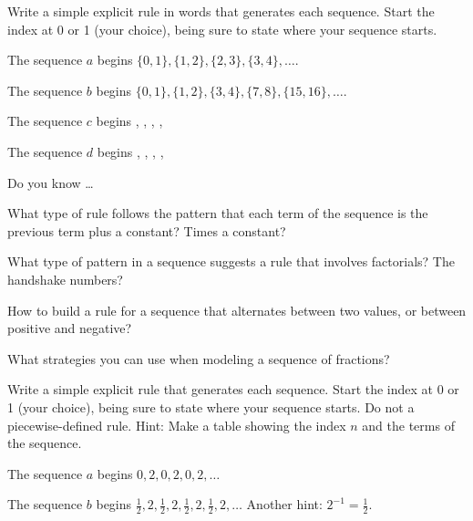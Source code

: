 \begin{exer}[\exerU] %
\label{exer_model_seq_sets_bs}
    Write a simple explicit rule in words that generates each sequence.  Start the index at 0 or 1 (your choice), being sure to state where your sequence starts. 
        \begin{exerpart}
            \item The sequence $a$ begins $\{0,1\}, \{1,2\}, \{2,3\}, \{3,4\},\ldots$.
            \item The sequence $b$ begins $\{0,1\}, \{1,2\}, \{3,4\}, \{7,8\}, \{15,16\},\ldots$.
            \item The sequence $c$ begins , , , , 
            \item The sequence $d$ begins , , , , 
    \end{exerpart}
\end{exer}

\begin{exer}[\exerR] %
\label{exer_dyk_next_term_explicit}
    Do you know \ldots
        \begin{exerpart}
            \item What type of rule follows the pattern that each term of the sequence is the previous term plus a constant?  Times a constant?
            \item What type of pattern in a sequence suggests a rule that involves factorials? The handshake numbers? 
            \item How to build a rule for a sequence that alternates between two values, or between positive and negative?
            \item What strategies you can use when modeling a sequence of fractions? 
        \end{exerpart}
\end{exer}

\begin{exer}[\exerE] %
\label{exer_NTE_alternate}
    Write a simple explicit rule that generates each sequence.  Start the index at 0 or 1 (your choice), being sure to state where your sequence starts. Do not a piecewise-defined rule. Hint: Make a table showing the index $n$ and the terms of the sequence.
        \begin{exerpart}
            \item The sequence $a$ begins $0, 2, 0, 2, 0, 2, \ldots$
            \item The sequence $b$ begins $\frac{1}{2}, 2, \frac{1}{2}, 2,\frac{1}{2}, 2,\frac{1}{2}, 2, \ldots$ \quad Another hint:  $2^{-1}= \frac{1}{2}$.
        \end{exerpart}
\end{exer}

